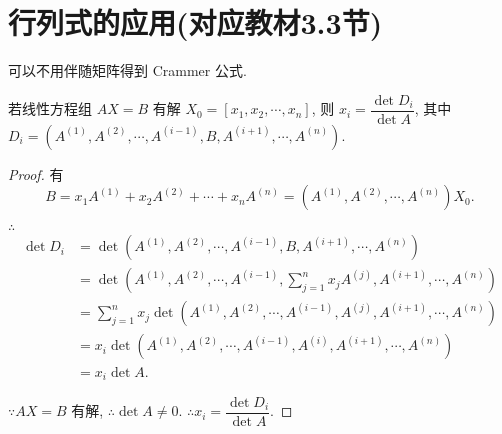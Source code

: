 \documentclass[color=black,device=normal,lang=cn,mode=geye]{elegantnote}
\begin{document}
\section{行列式的应用(对应教材3.3节)}
可以不用伴随矩阵得到 Crammer 公式.
\begin{theorem}[书上的定理 2]
    若线性方程组 $AX=B$ 有解 $X_0=[x_1,x_2,\cdots,x_n]$, 则 $x_i=\dfrac{\det D_i}{\det A}$, 其中 $D_i=(A^{(1)},A^{(2)},\cdots,A^{(i-1)},B,A^{(i+1)},\cdots,A^{(n)})$.
\end{theorem}
\begin{proof}    
    有
    \[B=x_1A^{(1)}+x_2A^{(2)}+\cdots+x_nA^{(n)}=(A^{(1)},A^{(2)},\cdots,A^{(n)})X_0.\]

    $\therefore$
    \begin{align*}
        \det D_i & =\det\left(A^{(1)},A^{(2)},\cdots,A^{(i-1)},B,A^{(i+1)},\cdots,A^{(n)}\right) \\
        & =\det\left(A^{(1)},A^{(2)},\cdots,A^{(i-1)},\sum\limits_{j=1}^nx_jA^{(j)},A^{(i+1)},\cdots,A^{(n)}\right) \\
        & =\sum\limits_{j=1}^nx_j\det\left(A^{(1)},A^{(2)},\cdots,A^{(i-1)},A^{(j)},A^{(i+1)},\cdots,A^{(n)}\right) \\
        & =x_i\det\left(A^{(1)},A^{(2)},\cdots,A^{(i-1)},A^{(i)},A^{(i+1)},\cdots,A^{(n)}\right) \\
        & =x_i\det A.
    \end{align*}

    $\because AX=B$ 有解, $\therefore\det A\neq0$. $\therefore x_i=\dfrac{\det D_i}{\det A}$.
\end{proof}
\end{document}
